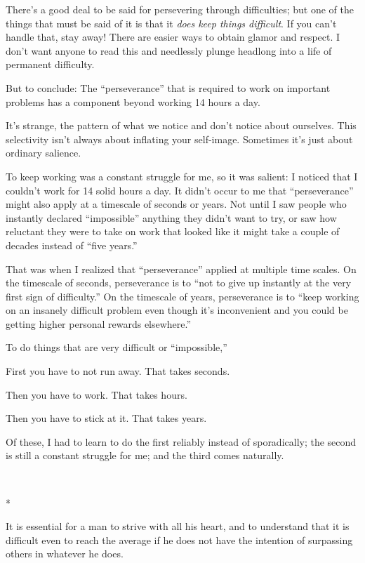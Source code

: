 {
 There's a good deal to be said for persevering
through difficulties; but one of the things that must be said of it is
that it \textit{does keep things difficult}. If you
can't handle that, stay away! There are easier ways to
obtain glamor and respect. I don't want anyone to read
this and needlessly plunge headlong into a life of permanent
difficulty.}

{
 But to conclude: The
``perseverance'' that is required to
work on important problems has a component beyond working 14 hours a
day.}

{
 It's strange, the pattern of what we notice and
don't notice about ourselves. This selectivity
isn't always about inflating your self-image. Sometimes
it's just about ordinary salience.}

{
 To keep working was a constant struggle for me, so it was salient:
I noticed that I couldn't work for 14 solid hours a
day. It didn't occur to me that
``perseverance'' might also apply at
a timescale of seconds or years. Not until I saw people who instantly
declared ``impossible'' anything
they didn't want to try, or saw how reluctant they were
to take on work that looked like it might take a couple of decades
instead of ``five years.''}

{
 That was when I realized that
``perseverance'' applied at multiple
time scales. On the timescale of seconds, perseverance is to
``not to give up instantly at the very first sign of
difficulty.'' On the timescale of years, perseverance
is to ``keep working on an insanely difficult problem
even though it's inconvenient and you could be getting
higher personal rewards elsewhere.''}

{
 To do things that are very difficult or
``impossible,''}

{
 First you have to not run away. That takes seconds.}

{
 Then you have to work. That takes hours.}

{
 Then you have to stick at it. That takes years.}

{
 Of these, I had to learn to do the first reliably instead of
sporadically; the second is still a constant struggle for me; and the
third comes naturally.}

{\centering
 \ ~
\par}

{\centering
 *
\par}


{
 It is essential for a man to strive with all his heart, and to
understand that it is difficult even to reach the average if he does
not have the intention of surpassing others in whatever he does.}

